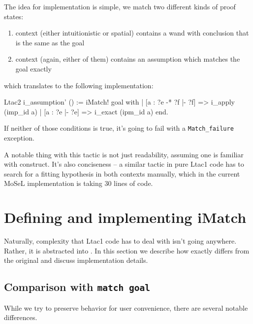 The idea for implementation is simple, we match two different kinds of proof states:
\begin{enumerate}
\item context (either intuitionistic or spatial) contains a wand with conclusion that is the same as the goal
\item context (again, either of them) contains an assumption which matches the goal exactly
\end{enumerate}

which translates to the following implementation:

\begin{minipage}{\linewidth}
\begin{coq}
Ltac2 i_assumption' () :=
  iMatch! goal with
  | [a : ?e -* ?f |- ?f] => i_apply (imp_id a)
  | [a : ?e |- ?e] => i_exact (ipm_id a)
  end.
\end{coq}
\end{minipage}

If neither of those conditions is true, it's going to fail with a {\color{red} \texttt{Match\_failure}} exception.

A notable thing with this tactic is not just readability, assuming one is familiar with  construct.
It's also conciseness -- a similar tactic in pure Ltac1 code has to search for a fitting hypothesis in both contexts manually, which in the current MoSeL implementation is taking 30 lines of code.

\section{Defining and implementing iMatch}
\label{sec:defin-impl-imatch}

Naturally, complexity that Ltac1 code has to deal with isn't going anywhere.
Rather, it is abstracted into .
In this section we describe how exactly  differs from the original  and discuss implementation details.

\subsection{Comparison with \texttt{match goal}}

While we try to preserve  behavior for user convenience, there are several notable differences.

